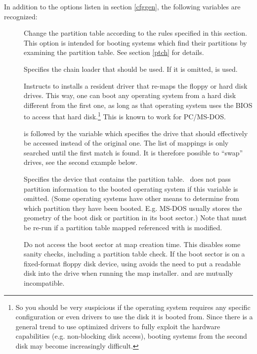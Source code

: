 In addition to the options listen in section \ref{cfggen}, the following
variables are recognized:
\begin{description}
  \item[] Change the partition table according to the rules
    specified in this  section. This option is intended for
    booting systems which find their partitions by examining the
    partition table. See section \ref{ptch} for details.
  \item[] Specifies the chain loader that
    should be used. If it is omitted,  is used.
  \item[] Instructs 
    to installs a resident driver that re-maps the floppy
    or hard disk drives. This way, one can boot any operating system from a
    hard disk different from the first one, as long as that operating system
    uses  the BIOS to access that hard disk.\footnote{So you
should be very suspicious if the
operating system requires any specific configuration or even drivers to use
the disk it is booted from. Since there is a general trend to use optimized
drivers to fully exploit the hardware capabilities (e.g. non-blocking disk
access), booting systems from the second disk may become increasingly
difficult.} This is known to work for PC/MS-DOS.

     is followed by the variable
     which specifies the drive that should
    effectively be accessed instead of the original one.
    The list of mappings is only searched until the first match is found.
    It is therefore possible to ``swap'' drives, see the second example below.
  \item[] Specifies the device that contains the
    partition
    table. \LILO\ does not pass partition information to the booted operating
    system if this variable is omitted. (Some operating systems have other
    means to determine from which partition they have been booted. E.g. MS-DOS
    usually stores the geometry of the boot disk or partition in its boot
    sector.) Note that  must be re-run if a partition table
    mapped referenced with  is modified.
  \item[] Do not access the boot sector at map creation time. This
    disables some sanity checks, including a partition table check. If the boot
    sector is on a fixed-format floppy disk device, using  avoids
    the need to put a readable disk into the drive when running the map
    installer.  and  are mutually incompatible.
\end{description}

